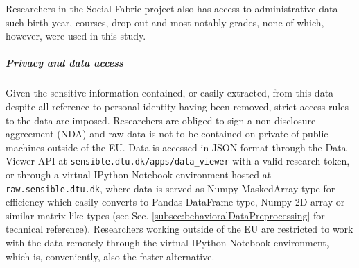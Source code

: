 
Researchers in the Social Fabric project also has access to administrative data such birth year, courses, drop-out and most notably grades, none of which, however, were used in this study.

\subparagraph*{Privacy and data access} Given the sensitive information contained, or easily extracted, from this data despite all reference to personal identity having been removed, strict access rules to the data are imposed. Researchers are obliged to sign a non-disclosure aggreement (NDA) and raw data is not to be contained on private of public machines outside of the EU. Data is accessed in JSON format through the Data Viewer API at \texttt{sensible.dtu.dk/apps/data\_viewer} with a valid research token, or through a virtual IPython Notebook environment hosted at \texttt{raw.sensible.dtu.dk}, where data is served as Numpy MaskedArray type for efficiency which easily converts to Pandas DataFrame type, Numpy 2D array or similar matrix-like types (see Sec. \ref{subsec:behavioralDataPreprocessing} for technical reference). Researchers working outside of the EU are restricted to work with the data remotely through the virtual IPython Notebook environment, which is, conveniently, also the faster alternative.